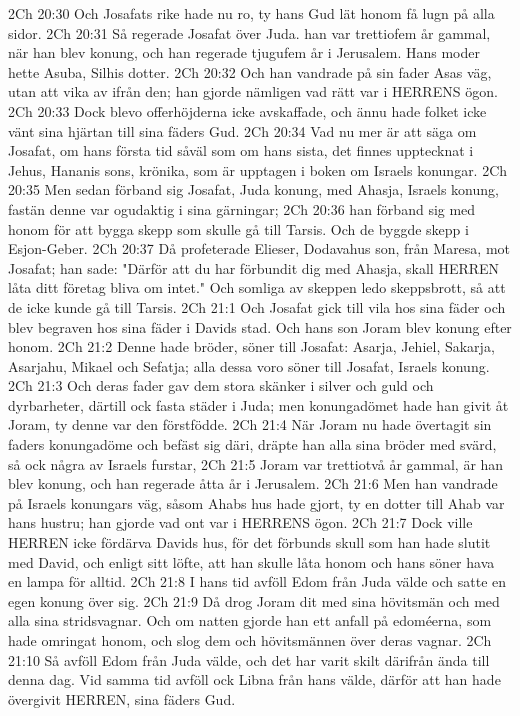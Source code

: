 2Ch 20:30  Och Josafats rike hade nu ro, ty hans Gud lät honom få lugn på alla sidor.
2Ch 20:31  Så regerade Josafat över Juda. han var trettiofem år gammal, när han blev konung, och han regerade tjugufem år i Jerusalem. Hans moder hette Asuba, Silhis dotter.
2Ch 20:32  Och han vandrade på sin fader Asas väg, utan att vika av ifrån den; han gjorde nämligen vad rätt var i HERRENS ögon.
2Ch 20:33  Dock blevo offerhöjderna icke avskaffade, och ännu hade folket icke vänt sina hjärtan till sina fäders Gud.
2Ch 20:34  Vad nu mer är att säga om Josafat, om hans första tid såväl som om hans sista, det finnes upptecknat i Jehus, Hananis sons, krönika, som är upptagen i boken om Israels konungar.
2Ch 20:35  Men sedan förband sig Josafat, Juda konung, med Ahasja, Israels konung, fastän denne var ogudaktig i sina gärningar;
2Ch 20:36  han förband sig med honom för att bygga skepp som skulle gå till Tarsis. Och de byggde skepp i Esjon-Geber.
2Ch 20:37  Då profeterade Elieser, Dodavahus son, från Maresa, mot Josafat; han sade: "Därför att du har förbundit dig med Ahasja, skall HERREN låta ditt företag bliva om intet." Och somliga av skeppen ledo skeppsbrott, så att de icke kunde gå till Tarsis.
2Ch 21:1  Och Josafat gick till vila hos sina fäder och blev begraven hos sina fäder i Davids stad. Och hans son Joram blev konung efter honom.
2Ch 21:2  Denne hade bröder, söner till Josafat: Asarja, Jehiel, Sakarja, Asarjahu, Mikael och Sefatja; alla dessa voro söner till Josafat, Israels konung.
2Ch 21:3  Och deras fader gav dem stora skänker i silver och guld och dyrbarheter, därtill ock fasta städer i Juda; men konungadömet hade han givit åt Joram, ty denne var den förstfödde.
2Ch 21:4  När Joram nu hade övertagit sin faders konungadöme och befäst sig däri, dräpte han alla sina bröder med svärd, så ock några av Israels furstar,
2Ch 21:5  Joram var trettiotvå år gammal, är han blev konung, och han regerade åtta år i Jerusalem.
2Ch 21:6  Men han vandrade på Israels konungars väg, såsom Ahabs hus hade gjort, ty en dotter till Ahab var hans hustru; han gjorde vad ont var i HERRENS ögon.
2Ch 21:7  Dock ville HERREN icke fördärva Davids hus, för det förbunds skull som han hade slutit med David, och enligt sitt löfte, att han skulle låta honom och hans söner hava en lampa för alltid.
2Ch 21:8  I hans tid avföll Edom från Juda välde och satte en egen konung över sig.
2Ch 21:9  Då drog Joram dit med sina hövitsmän och med alla sina stridsvagnar. Och om natten gjorde han ett anfall på edoméerna, som hade omringat honom, och slog dem och hövitsmännen över deras vagnar.
2Ch 21:10  Så avföll Edom från Juda välde, och det har varit skilt därifrån ända till denna dag. Vid samma tid avföll ock Libna från hans välde, därför att han hade övergivit HERREN, sina fäders Gud.
